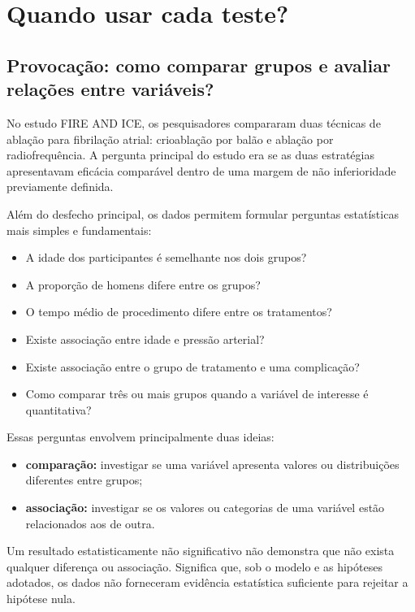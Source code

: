 \chapter{Quando usar cada teste?}

\section{Provocação: como comparar grupos e avaliar relações entre variáveis?}

No estudo FIRE AND ICE, os pesquisadores compararam duas técnicas de ablação
para fibrilação atrial: crioablação por balão e ablação por radiofrequência.
A pergunta principal do estudo era se as duas estratégias apresentavam eficácia
comparável dentro de uma margem de não inferioridade previamente definida.

Além do desfecho principal, os dados permitem formular perguntas estatísticas
mais simples e fundamentais:

\begin{itemize}
    \item A idade dos participantes é semelhante nos dois grupos?
    \item A proporção de homens difere entre os grupos?
    \item O tempo médio de procedimento difere entre os tratamentos?
    \item Existe associação entre idade e pressão arterial?
    \item Existe associação entre o grupo de tratamento e uma complicação?
    \item Como comparar três ou mais grupos quando a variável de interesse é quantitativa?
\end{itemize}

Essas perguntas envolvem principalmente duas ideias:

\begin{itemize}
    \item \textbf{comparação:} investigar se uma variável apresenta valores ou
    distribuições diferentes entre grupos;
    \item \textbf{associação:} investigar se os valores ou categorias de uma
    variável estão relacionados aos de outra.
\end{itemize}

Um resultado estatisticamente não significativo não demonstra que não exista
qualquer diferença ou associação. Significa que, sob o modelo e as hipóteses
adotados, os dados não forneceram evidência estatística suficiente para
rejeitar a hipótese nula.

